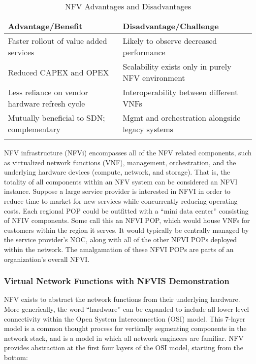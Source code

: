 \begin{longtable}{ll}
\toprule
\textbf{Advantage/Benefit}
&
\textbf{Disadvantage/Challenge}
\\ \midrule
Faster rollout of value added services
&
Likely to observe decreased performance
\\ \midrule
Reduced CAPEX and OPEX
&
Scalability exists only in purely NFV environment
\\ \midrule
Less reliance on vendor hardware refresh cycle
&
Interoperability between different VNFs
\\ \midrule
Mutually beneficial to SDN; complementary
&
Mgmt and orchestration alongside legacy systems
\\
\bottomrule
\caption{NFV Advantages and Disadvantages}
\end{longtable}

NFV infrastructure (NFVi) encompasses all of the NFV related components, such
as virtualized network functions (VNF), management, orchestration, and the
underlying hardware devices (compute, network, and storage). That is, the
totality of all components within an NFV system can be considered an NFVI
instance. Suppose a large service provider is interested in NFVI in order to
reduce time to market for new services while concurrently reducing operating
costs. Each regional POP could be outfitted with a ``mini data center''
consisting of NFIV components. Some call this an NFVI POP, which would house
VNFs for customers within the region it serves. It would typically be
centrally managed by the service provider's NOC, along with all of the other
NFVI POPs deployed within the network. The amalgamation of these NFVI POPs are
parts of an organization's overall NFVI.

\subsubsection{Virtual Network Functions with NFVIS Demonstration}
NFV exists to abstract the network functions from their underlying hardware.
More generically, the word ``hardware'' can be expanded to include all lower
level connectivity within the Open System Interconnection (OSI) model. This
7-layer model is a common thought process for vertically segmenting components
in the network stack, and is a model in which all network engineers are
familiar. NFV provides abstraction at the first four layers of the OSI model,
starting from the bottom:

